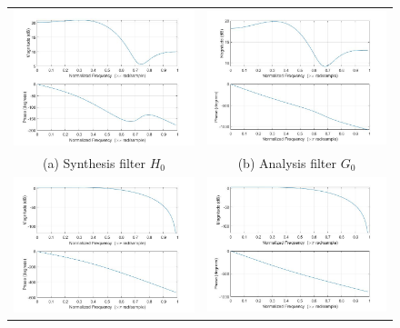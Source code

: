 \begin{figure}[htpb]
\centering
\begin{tabular}{cc}
  \includegraphics[trim={0 9cm 0 0}, clip, width=75mm]{H0.jpg} & \includegraphics[trim={0 9cm 0 0}, clip,width=75mm]{G0.jpg} \\
(a) Synthesis filter $H_0$ & (b) Analysis filter $G_0$ \\[6pt]
 \includegraphics[trim={0 9cm 0 0}, clip,width=75mm]{H1.jpg} & \includegraphics[trim={0 9cm 0 0}, clip,width=75mm]{G1.jpg} \\

\end{tabular}
\end{figure}
